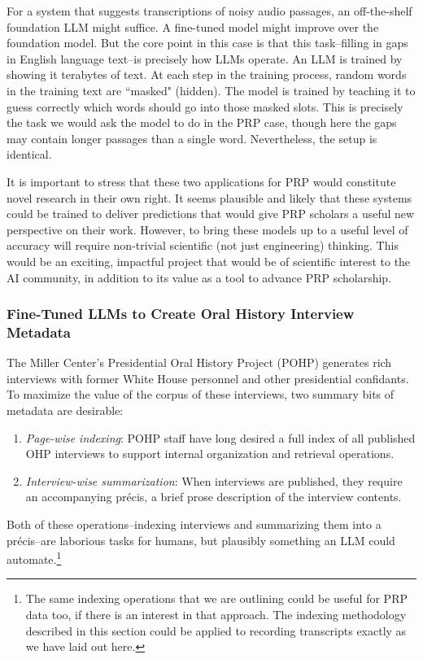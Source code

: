 \documentclass[12pt, oneside]{article}   	%
\begin{document}
For a system that suggests transcriptions of noisy audio passages, an off-the-shelf foundation LLM might suffice.  A fine-tuned model might improve over the foundation model.  But the core point in this case is that this task--filling in gaps in English language text--is precisely how LLMs operate.  An LLM is trained by showing it terabytes of text.  At each step in the training process, random words in the training text are ``masked" (hidden).  The model is trained by teaching it to guess correctly which words should go into those masked slots.  This is precisely the task we would ask the model to do in the PRP case, though here the gaps may contain longer passages than a single word.  Nevertheless, the setup is identical.

It is important to stress that these two applications for PRP would constitute novel research in their own right.  It seems plausible and likely that these systems could be trained to deliver predictions that would give PRP scholars a useful new perspective on their work.  However, to bring these models up to a useful level of accuracy will require non-trivial scientific (not just engineering) thinking.  This would be an exciting, impactful project that would be of scientific interest to the AI community, in addition to its value as a tool to advance PRP scholarship.


\subsubsection{Fine-Tuned LLMs to Create Oral History Interview Metadata}\label{section.applications.hard.pohp}
The Miller Center's Presidential Oral History Project (POHP) generates rich interviews with former White House personnel and other presidential confidants.  To maximize the value of the corpus of these interviews, two summary bits of metadata are desirable:
\begin{enumerate}
\item \emph{Page-wise indexing}: POHP staff have long desired a full index of all published OHP interviews to support internal organization and retrieval operations.
\item \emph{Interview-wise summarization}: When interviews are published, they require an accompanying pr\'{e}cis, a brief prose description of the interview contents.
\end{enumerate} 
Both of these operations--indexing interviews and summarizing them into a pr\'{e}cis--are laborious tasks for humans, but plausibly something an LLM could automate.\footnote{The same indexing operations that we are outlining could be useful for PRP data too, if there is an interest in that approach.  The indexing methodology described in this section could be applied to recording transcripts exactly as we have laid out here.}
\end{document}
